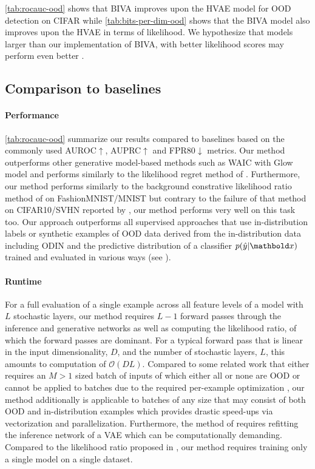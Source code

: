 \cref{tab:rocauc-ood} shows that BIVA improves upon the HVAE model for OOD detection on CIFAR while \cref{tab:bits-per-dim-ood} shows that the BIVA model also improves upon the HVAE in terms of likelihood.
We hypothesize that models larger than our implementation of BIVA, with better likelihood scores may perform even better \cite{maaloe_biva_2019, vahdat_nvae_2020, child_very_2021}.


\subsection{Comparison to baselines}
\paragraph{Performance} \cref{tab:rocauc-ood} summarize our results compared to baselines based on the commonly used AUROC$\uparrow$, AUPRC$\uparrow$ and FPR80$\downarrow$ metrics.
Our method outperforms other generative model-based methods such as WAIC \cite{choi_waic_2019} with Glow model and performs similarly to the likelihood regret method of \cite{xiao_likelihood_2020}.
Furthermore, our method performs similarly to the background constrative likelihood ratio method of \textcite{ren_likelihood_2019} on FashionMNIST/MNIST but contrary to the failure of that method on CIFAR10/SVHN reported by \cite{xiao_likelihood_2020}, our method performs very well on this task too.
Our approach outperforms all supervised approaches that use in-distribution labels or synthetic examples of OOD data derived from the in-distribution data including ODIN \cite{liang_enhancing_2018} and the predictive distribution of a classifier $p(\hat{y}|\xb)$ trained and evaluated in various ways (see \textcite{ren_likelihood_2019}).

\paragraph{Runtime} For a full evaluation of a single example across all feature levels of a model with $L$ stochastic layers, our method requires $L-1$ forward passes through the inference and generative networks as well as computing the likelihood ratio, of which the forward passes are dominant.
For a typical forward pass that is linear in the input dimensionality, $D$, and the number of stochastic layers, $L$, this amounts to computation of $\mathcal{O}(DL)$.
Compared to some related work that either requires an $M>1$ sized batch of inputs of which either all or none are OOD \cite{nalisnick_detecting_2019} or cannot be applied to batches due to the required per-example optimization \cite{xiao_likelihood_2020}, our method additionally is applicable to batches of any size that may consist of both OOD and in-distribution examples which provides drastic speed-ups via vectorization and parallelization.
Furthermore, the method of \textcite{xiao_fashionmnist_2017} requires refitting the inference network of a VAE which can be computationally demanding.
Compared to the likelihood ratio proposed in \textcite{ren_likelihood_2019}, our method requires training only a single model on a single dataset.


